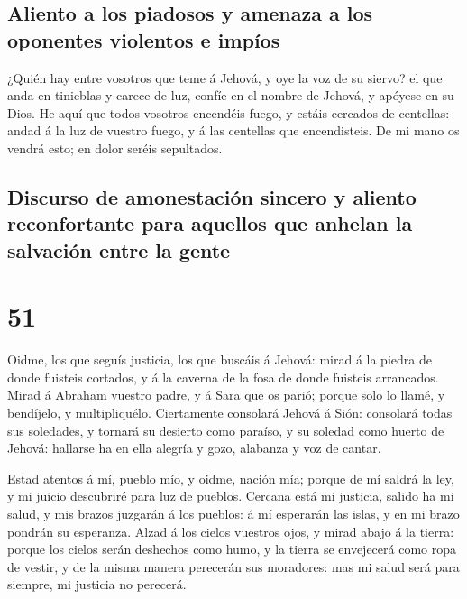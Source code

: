 \hypertarget{aliento-a-los-piadosos-y-amenaza-a-los-oponentes-violentos-e-impuxedos}{%
\subsection{Aliento a los piadosos y amenaza a los oponentes violentos e
impíos}\label{aliento-a-los-piadosos-y-amenaza-a-los-oponentes-violentos-e-impuxedos}}

 ¿Quién hay entre vosotros que teme á Jehová, y oye la
voz de su siervo? el que anda en tinieblas y carece de luz, confíe en el
nombre de Jehová, y apóyese en su Dios.  He aquí que
todos vosotros encendéis fuego, y estáis cercados de centellas: andad á
la luz de vuestro fuego, y á las centellas que encendisteis. De mi mano
os vendrá esto; en dolor seréis sepultados.

\hypertarget{discurso-de-amonestaciuxf3n-sincero-y-aliento-reconfortante-para-aquellos-que-anhelan-la-salvaciuxf3n-entre-la-gente}{%
\subsection{Discurso de amonestación sincero y aliento reconfortante
para aquellos que anhelan la salvación entre la
gente}\label{discurso-de-amonestaciuxf3n-sincero-y-aliento-reconfortante-para-aquellos-que-anhelan-la-salvaciuxf3n-entre-la-gente}}

\hypertarget{section-23-51}{%
\section{51}\label{section-23-51}}

 Oidme, los que seguís justicia, los que buscáis á Jehová:
mirad á la piedra de donde fuisteis cortados, y á la caverna de la fosa
de donde fuisteis arrancados.  Mirad á Abraham vuestro
padre, y á Sara que os parió; porque solo lo llamé, y bendíjelo, y
multipliquélo.  Ciertamente consolará Jehová á Sión:
consolará todas sus soledades, y tornará su desierto como paraíso, y su
soledad como huerto de Jehová: hallarse ha en ella alegría y gozo,
alabanza y voz de cantar.

 Estad atentos á mí, pueblo mío, y oidme, nación mía;
porque de mí saldrá la ley, y mi juicio descubriré para luz de pueblos.
 Cercana está mi justicia, salido ha mi salud, y mis
brazos juzgarán á los pueblos: á mí esperarán las islas, y en mi brazo
pondrán su esperanza.  Alzad á los cielos vuestros ojos, y
mirad abajo á la tierra: porque los cielos serán deshechos como humo, y
la tierra se envejecerá como ropa de vestir, y de la misma manera
perecerán sus moradores: mas mi salud será para siempre, mi justicia no
perecerá.

